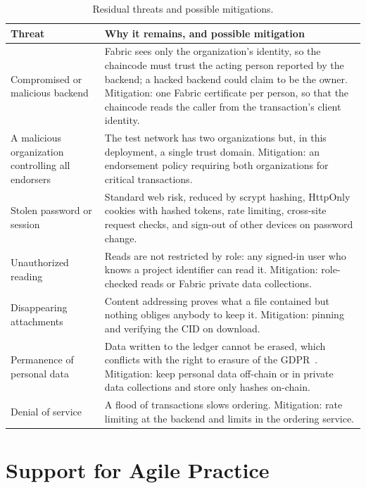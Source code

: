 \begin{table}[tb]
    \centering
    \small
    \begin{tabular}{p{3.6cm}p{8.4cm}}
        \toprule
        Threat & Why it remains, and possible mitigation \\
        \midrule
        Compromised or malicious backend & Fabric sees only the organization's identity, so the chaincode must trust the acting person reported by the backend; a hacked backend could claim to be the owner. Mitigation: one Fabric certificate per person, so that the chaincode reads the caller from the transaction's client identity. \\
        A malicious organization controlling all endorsers & The test network has two organizations but, in this deployment, a single trust domain. Mitigation: an endorsement policy requiring both organizations for critical transactions. \\
        Stolen password or session & Standard web risk, reduced by scrypt hashing, HttpOnly cookies with hashed tokens, rate limiting, cross-site request checks, and sign-out of other devices on password change. \\
        Unauthorized reading & Reads are not restricted by role: any signed-in user who knows a project identifier can read it. Mitigation: role-checked reads or Fabric private data collections. \\
        Disappearing attachments & Content addressing proves what a file contained but nothing obliges anybody to keep it. Mitigation: pinning and verifying the CID on download. \\
        Permanence of personal data & Data written to the ledger cannot be erased, which conflicts with the right to erasure of the GDPR~\cite{gdpr}. Mitigation: keep personal data off-chain or in private data collections and store only hashes on-chain. \\
        Denial of service & A flood of transactions slows ordering. Mitigation: rate limiting at the backend and limits in the ordering service. \\
        \bottomrule
    \end{tabular}
    \caption{Residual threats and possible mitigations.}
    \label{tab:threats}
\end{table}

\section{Support for Agile Practice}
\label{sec:results-agile}

